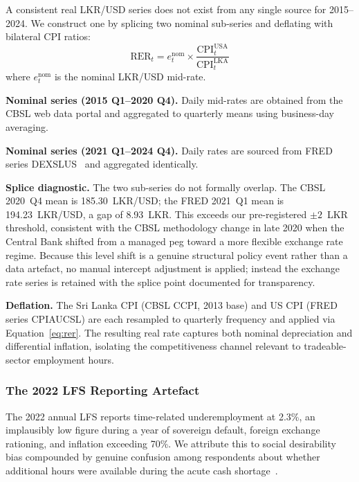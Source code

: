 \documentclass[sigconf]{acmart}
\begin{document}
A consistent real LKR/USD series does not exist from any single
source for 2015--2024. We construct one by splicing two nominal
sub-series and deflating with bilateral CPI ratios:
%
\begin{equation}
  \text{RER}_t = e_t^{\text{nom}} \times
  \frac{\text{CPI}_t^{\text{USA}}}{\text{CPI}_t^{\text{LKA}}}
  \label{eq:rer}
\end{equation}
%
where $e_t^{\text{nom}}$ is the nominal LKR/USD mid-rate.

\textbf{Nominal series (2015 Q1--2020 Q4).} Daily mid-rates are
obtained from the CBSL web data portal and aggregated to quarterly
means using business-day averaging.

\textbf{Nominal series (2021 Q1--2024 Q4).} Daily rates are sourced
from FRED series DEXSLUS~\cite{cbsl2025} and aggregated identically.

\textbf{Splice diagnostic.} The two sub-series do not formally
overlap. The CBSL 2020~Q4 mean is 185.30~LKR/USD; the FRED 2021~Q1
mean is 194.23~LKR/USD, a gap of 8.93~LKR. This exceeds our
pre-registered $\pm 2$~LKR threshold, consistent with the CBSL
methodology change in late 2020 when the Central Bank shifted from a
managed peg toward a more flexible exchange rate regime. Because this
level shift is a genuine structural policy event rather than a data
artefact, no manual intercept adjustment is applied; instead the
exchange rate series is retained with the splice point documented
for transparency.

\textbf{Deflation.} The Sri Lanka CPI (CBSL CCPI, 2013 base) and
US CPI (FRED series CPIAUCSL) are each resampled to quarterly
frequency and applied via Equation~\ref{eq:rer}. The resulting real
rate captures both nominal depreciation and differential inflation,
isolating the competitiveness channel relevant to tradeable-sector
employment hours.

\subsubsection{The 2022 LFS Reporting Artefact}

The 2022 annual LFS reports time-related underemployment at 2.3\%, an
implausibly low figure during a year of sovereign default, foreign
exchange rationing, and inflation exceeding 70\%. We attribute this to
social desirability bias compounded by genuine confusion among
respondents about whether additional hours were available during the
acute cash shortage~\cite{dcs2025}.
\end{document}
